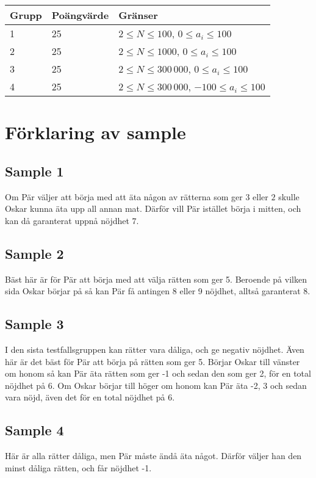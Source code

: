 \begin{tabular}{| l | l | l |}
\hline
Grupp & Poängvärde & Gränser \\ \hline
1     & 25         & $2 \le N \le 100$, $0 \le a_i \le 100$ \\ \hline
2     & 25         & $2 \le N \le 1000$, $0 \le a_i \le 100$ \\ \hline
3     & 25         & $2 \le N \le 300\,000$, $0 \le a_i \le 100$ \\ \hline
4     & 25         & $2 \le N \le 300\,000$, $-100 \le a_i \le 100$ \\ \hline
\end{tabular}

\section*{Förklaring av sample}
\subsection*{Sample 1}
Om Pär väljer att börja med att äta någon av rätterna som ger $3$ eller $2$ skulle Oskar kunna äta upp all annan mat. Därför vill Pär istället börja i mitten, och kan då garanterat uppnå nöjdhet $7$.
\subsection*{Sample 2}
Bäst här är för Pär att börja med att välja rätten som ger 5. Beroende på vilken sida Oskar börjar på så kan Pär få antingen 8 eller 9 nöjdhet, alltså garanterat 8.
\subsection*{Sample 3}
I den sista testfallsgruppen kan rätter vara dåliga, och ge negativ nöjdhet. Även här är det bäst för Pär att börja på rätten som ger 5. Börjar Oskar till vänster om honom så kan Pär äta rätten som ger -1 och sedan den som ger 2, för en total nöjdhet på 6. Om Oskar börjar till höger om honom kan Pär äta -2, 3 och sedan vara nöjd, även det för en total nöjdhet på 6.
\subsection*{Sample 4}
Här är alla rätter dåliga, men Pär måste ändå äta något. Därför väljer han den minst dåliga rätten, och får nöjdhet -1.
